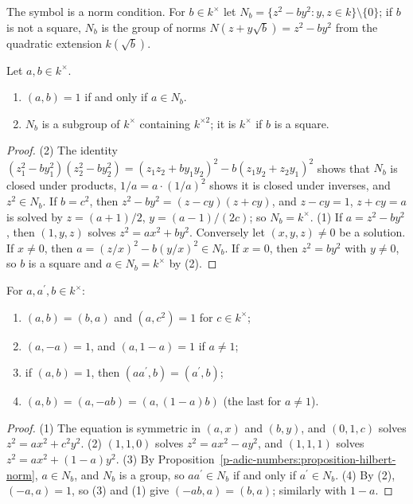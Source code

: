 The symbol is a norm condition. For $b \in k^\times$ let $N_b = \{z^2 - by^2 : y, z \in k\} \setminus \{0\}$; if $b$ is not a square, $N_b$ is the group of norms $N(z + y\sqrt b) = z^2 - by^2$ from the quadratic
extension $k(\sqrt b)$.

\begin{proposition}\label{p-adic-numbers:proposition-hilbert-norm}
Let $a, b \in k^\times$.
\begin{enumerate}
\item $(a, b) = 1$ if and only if $a \in N_b$.
\item $N_b$ is a subgroup of $k^\times$ containing $k^{\times2}$; it is $k^\times$ if $b$ is a square.
\end{enumerate}
\end{proposition}

\begin{proof}
(2) The identity $(z_1^2 - by_1^2)(z_2^2 - by_2^2) = (z_1z_2 + by_1y_2)^2 - b(z_1y_2 + z_2y_1)^2$ shows that $N_b$ is closed under products, $1/a = a \cdot (1/a)^2$ shows it is closed under inverses, and
$z^2 \in N_b$. If $b = c^2$, then $z^2 - by^2 = (z - cy)(z + cy)$, and $z - cy = 1$, $z + cy = a$ is solved by $z = (a + 1)/2$, $y = (a - 1)/(2c)$; so $N_b = k^\times$.
(1) If $a = z^2 - by^2$, then $(1, y, z)$ solves $z^2 = ax^2 + by^2$. Conversely let $(x, y, z) \neq 0$ be a solution. If $x \neq 0$, then $a = (z/x)^2 - b(y/x)^2 \in N_b$. If $x = 0$, then $z^2 = by^2$ with
$y \neq 0$, so $b$ is a square and $a \in N_b = k^\times$ by (2).
\end{proof}

\begin{proposition}\label{p-adic-numbers:proposition-hilbert-properties}
For $a, a^{\prime}, b \in k^\times$:
\begin{enumerate}
\item $(a, b) = (b, a)$ and $(a, c^2) = 1$ for $c \in k^\times$;
\item $(a, -a) = 1$, and $(a, 1 - a) = 1$ if $a \neq 1$;
\item if $(a, b) = 1$, then $(aa^{\prime}, b) = (a^{\prime}, b)$;
\item $(a, b) = (a, -ab) = (a, (1 - a)b)$ (the last for $a \neq 1$).
\end{enumerate}
\end{proposition}

\begin{proof}
(1) The equation is symmetric in $(a, x)$ and $(b, y)$, and $(0, 1, c)$ solves $z^2 = ax^2 + c^2y^2$. (2) $(1, 1, 0)$ solves $z^2 = ax^2 - ay^2$, and $(1, 1, 1)$ solves $z^2 = ax^2 + (1 - a)y^2$.
(3) By Proposition~\ref{p-adic-numbers:proposition-hilbert-norm}, $a \in N_b$, and $N_b$ is a group, so $aa^{\prime} \in N_b$ if and only if $a^{\prime} \in N_b$. (4) By (2), $(-a, a) = 1$, so (3) and (1) give
$(-ab, a) = (b, a)$; similarly with $1 - a$.
\end{proof}

